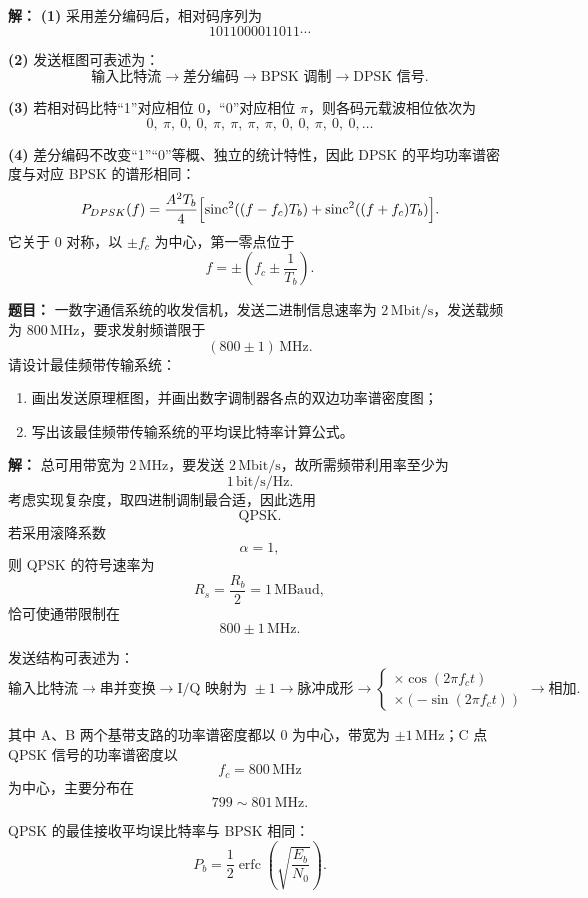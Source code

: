 \par\textbf{解：}
\textbf{(1)} 采用差分编码后，相对码序列为
\[
1011000011011\cdots
\]

\textbf{(2)} 发送框图可表述为：
\[
\text{输入比特流}
\rightarrow
\text{差分编码}
\rightarrow
\text{BPSK 调制}
\rightarrow
\text{DPSK 信号}.
\]

\textbf{(3)} 若相对码比特“1”对应相位 $0$，“0”对应相位 $\pi$，则各码元载波相位依次为
\[
0,\ \pi,\ 0,\ 0,\ \pi,\ \pi,\ \pi,\ \pi,\ 0,\ 0,\ \pi,\ 0,\ 0,\dots
\]

\textbf{(4)} 差分编码不改变“1”“0”等概、独立的统计特性，因此 DPSK 的平均功率谱密度与对应 BPSK 的谱形相同：
\[
P_{DPSK}(f)=\frac{A^2T_b}{4}
\Bigl[
\operatorname{sinc}^2((f-f_c)T_b)+\operatorname{sinc}^2((f+f_c)T_b)
\Bigr].
\]
它关于 $0$ 对称，以 $\pm f_c$ 为中心，第一零点位于
\[
f=\pm\left(f_c\pm \frac{1}{T_b}\right).
\]

\medskip
{}
\textbf{题目：}
一数字通信系统的收发信机，发送二进制信息速率为 $2\,\mathrm{Mbit/s}$，发送载频为 $800\,\mathrm{MHz}$，要求发射频谱限于
\[
(800\pm 1)\,\mathrm{MHz}.
\]
请设计最佳频带传输系统：
\begin{enumerate}
\item 画出发送原理框图，并画出数字调制器各点的双边功率谱密度图；
\item 写出该最佳频带传输系统的平均误比特率计算公式。
\end{enumerate}

\par\textbf{解：}
总可用带宽为 $2\,\mathrm{MHz}$，要发送 $2\,\mathrm{Mbit/s}$，故所需频带利用率至少为
\[
1\,\mathrm{bit/s/Hz}.
\]
考虑实现复杂度，取四进制调制最合适，因此选用
\[
\text{QPSK}.
\]
若采用滚降系数
\[
\alpha=1,
\]
则 QPSK 的符号速率为
\[
R_s=\frac{R_b}{2}=1\,\mathrm{MBaud},
\]
恰可使通带限制在
\[
800\pm1\,\mathrm{MHz}.
\]

发送结构可表述为：
\[
\text{输入比特流}
\rightarrow
\text{串并变换}
\rightarrow
\text{I/Q 映射为 }\pm1
\rightarrow
\text{脉冲成形}
\rightarrow
\begin{cases}
\times \cos(2\pi f_ct)\\
\times (-\sin(2\pi f_ct))
\end{cases}
\rightarrow
\text{相加}.
\]

其中 A、B 两个基带支路的功率谱密度都以 $0$ 为中心，带宽为 $\pm1\,\mathrm{MHz}$；C 点 QPSK 信号的功率谱密度以
\[
f_c=800\,\mathrm{MHz}
\]
为中心，主要分布在
\[
799\sim 801\,\mathrm{MHz}.
\]

QPSK 的最佳接收平均误比特率与 BPSK 相同：
\[
P_b=\frac12\operatorname{erfc}\!\left(\sqrt{\frac{E_b}{N_0}}\right).
\]

